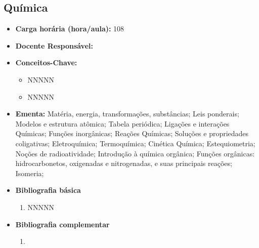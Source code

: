 \documentclass[11pt,fleqn]{book} %
\begin{document}
\subsection{Química}\label{disc:quimica}
\begin{itemize}
	\item \textbf{Carga horária (hora/aula):} 108
	\item \textbf{Docente Responsável:}
	\item \textbf{Conceitos-Chave:}
	\begin{itemize}
		\item NNNNN
		\item NNNNN
	\end{itemize}
	\item \textbf{Ementa:} Matéria, energia, transformações, substâncias;
	Leis ponderais;
	Modelos e estrutura atômica;
	Tabela periódica;
	Ligações e interações Químicas;
	Funções inorgânicas;
	Reações Químicas;
	Soluções e propriedades coligativas;
	Eletroquímica;
	Termoquímica;
	Cinética Química;
	Estequiometria;
	Noções de radioatividade;
	Introdução à química orgânica;
	Funções orgânicas: hidrocarbonetos, oxigenadas e nitrogenadas, e suas principais reações; 
	Isomeria;
	\item \textbf{Bibliografia básica}
	\begin{enumerate}
		\item NNNNN
	\end{enumerate}
	\item \textbf{Bibliografia complementar}
	\begin{enumerate}
		\item 
	\end{enumerate}	
\end{itemize}



\newpage
\end{document}
